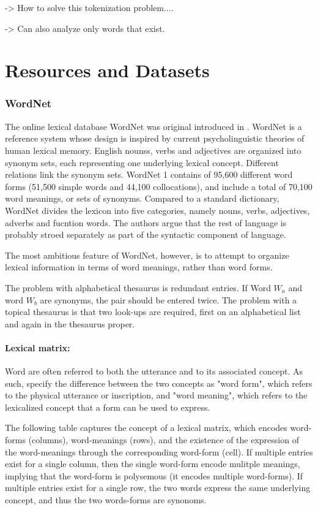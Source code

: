 \documentclass[a4paper,12pt,twoside,openright]{report}
\begin{document}
-> How to solve this tokenization problem....

-> Can also analyze only words that exist.


\section{Resources and Datasets}

\subsubsection{WordNet}

The online lexical database WordNet was original introduced in \cite{miller90}.
WordNet is a reference system whose design is inspired by current psycholinguistic theories of human lexical memory.
English nounss, verbs and adjectives are organized into synonym sets, each representing one underlying lexical concept.
Different relations link the synonym sets.
WordNet 1 contains of 95,600 different word forms (51,500 simple words and 44,100 collocations), and include a total of 70,100 word meanings, or sets of synonyms.
Compared to a standard dictionary, WordNet divides the lexicon into five categories, namely nouns, verbs, adjectives, adverbs and fucntion words. 
The authors argue that the rest of language is probably stroed separately as part of the syntactic component of language.

The most ambitious feature of WordNet, however, is to attempt to organize lexical information in terms of word meanings, rather than word forms.

The problem with alphabetical thesaurus is redundant entries. If Word $W_a$ and word $W_b$ are synonyms, the pair should be entered twice.
The problem with a topical thesaurus is that two look-ups are required, first on an alphabetical list and again in the thesaurus proper.

\paragraph{Lexical matrix:} 
Word are often referred to both the utterance and to its associated concept.
As such, \cite{miller90} specify the difference between the two concepts as "word form", which refers to the physical utterance or inscription, and "word meaning", which refers to the lexicalized concept that a form can be used to express.

The following table captures the concept of a lexical matrix, which encodes word-forms (columns), word-meanings (rows), and the existence of the expression of the word-meanings through the corresponding word-form (cell).
If multiple entries exist for a single column, then the single word-form encode mulitple meanings, implying that the word-form is polysemous (it encodes multiple word-forms).
If multiple entries exist for a single row, the two words express the same underlying concept, and thus the two words-forms are synonoms.
\end{document}
